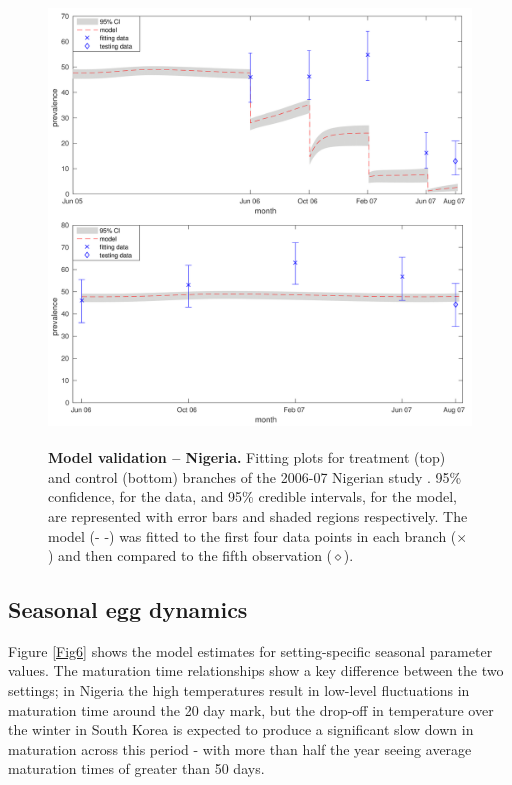 \begin{figure}[!ht]
\includegraphics[height=12cm]{Project/Figures/STH/Fig4.pdf}
\caption[Model fitting and validation (Nigeria)]{{\bf Model validation -- Nigeria.}
Fitting plots for treatment (top) and control (bottom) branches of the 2006-07 Nigerian study \cite{Kirwan}. 95\% confidence, for the data, and 95\% credible intervals, for the model, are represented with error bars and shaded regions respectively. The model (- -) was fitted to the first four data points in each branch ($\times$) and then compared to the fifth observation ($\diamond$).}
\label{Fig4}
\end{figure} 

\subsection[Egg dynamics]{Seasonal egg dynamics}

Figure \ref{Fig6} shows the model estimates for setting-specific seasonal parameter values. The maturation time relationships show a key difference between the two settings; in Nigeria the high temperatures result in low-level fluctuations in maturation time around the 20 day mark, but the drop-off in temperature over the winter in South Korea is expected to produce a significant slow down in maturation across this period - with more than half the year seeing average maturation times of greater than 50 days.

